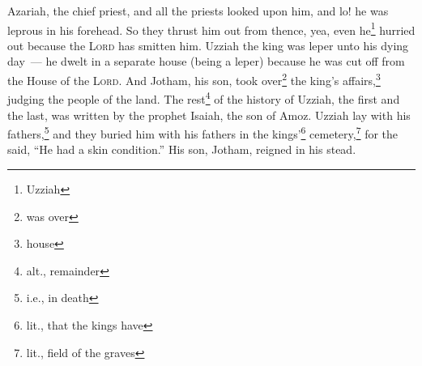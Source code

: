 \begin{inparaenum}
     Azariah, the chief priest, and all the priests looked upon him, and lo! he was leprous in his forehead. So they thrust him out from thence, yea, even he\footnote{Uzziah} hurried out because the \textsc{Lord} has smitten him.%
     Uzziah the king was leper unto his dying day~--- he dwelt in a separate house (being a leper) because he was cut off from the House of the \textsc{Lord}. And Jotham, his son, took over\footnote{was over} the king's affairs,\footnote{house} judging the people of the land.%
     The rest\footnote{alt., remainder} of the history of Uzziah, the first and the last, was written by the prophet Isaiah, the son of Amoz.%
     Uzziah lay with his fathers,\footnote{i.e., in death} and they buried him with his fathers in the kings'\footnote{lit., that the kings have} cemetery,\footnote{lit., field of the graves} for the said, ``He had a skin condition.'' His son, Jotham, reigned in his stead.%
\end{inparaenum}
